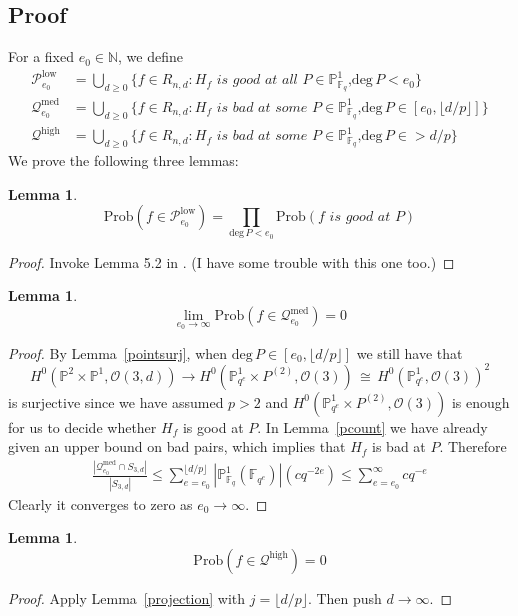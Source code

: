 \documentclass[12pt]{article}
\theoremstyle{plain}
\newtheorem{lemma}[equation]{Lemma}
\theoremstyle{definition}
\newcommand{\sP}{\mathcal{P}}
\newcommand{\IN}{\mathbb{N}}
\newcommand{\IF}{\mathbb{F}}
\newcommand{\IP}{\mathbb{P}}
\newcommand{\sO}{\mathcal{O}}
\renewcommand{\deg}{\mathrm{deg}\,}
\newcommand\iso{{\, \cong \,}}
\newcommand\union{\bigcup}
\newcommand{\<}{\langle}
\renewcommand{\>}{\rangle}
\newcommand{\fl}[1]{\lfloor #1 \rfloor}
\newcommand{\sQ}{\mathcal{Q}}
\newcommand{\Prob}{\mathrm{Prob}}
\begin{document}
\subsection{Proof}
For a fixed $e_0 \in \IN$, we define 
\begin{align*}
\sP_{e_0}^{\mathrm{low}} &= \union_{d \ge 0} \{ f \in R_{n, d} : H_f \textit{ is good at all $P \in \IP^1_{\IF_q}$,}\deg P < e_0\}\\
\sQ_{e_0}^{\mathrm{med}} &= \union_{d \ge 0} \{f \in R_{n, d} : H_f \textit{ is bad at some $P \in \IP^1_{\IF_q}$,}\deg P \in [e_0, \lfloor d/p \rfloor]\}\\
\sQ^{\mathrm{high}} &= \union_{d \ge 0} \{f \in R_{n, d} : H_f \textit{ is bad at some $P \in \IP^1_{\IF_q}$,}\deg P \in > d/p\}
\end{align*}
We prove the following three lemmas: 
\begin{lemma}
$$\Prob(f \in \sP_{e_0}^{\mathrm{low}}) = \prod_{\deg P < e_0} \Prob(f \textit{ is good at }P)$$
\end{lemma}
\begin{proof}
Invoke Lemma 5.2 in \cite{Wood}. (I have some trouble with this one too.)
\end{proof}

\begin{lemma}
$$ \lim_{e_0 \to \infty} \Prob(f \in \sQ_{e_0}^{\mathrm{med}}) = 0 $$
\end{lemma}
\begin{proof}
By Lemma~\ref{pointsurj}, when $\deg P \in [e_0, \lfloor d/p \rfloor]$ we still have that 
$$ H^0(\IP^2 \times \IP^1, \sO(3, d)) \to H^0(\IP^1_{q^e} \times P^{(2)}, \sO(3)) \iso H^0(\IP^1_{q^e}, \sO(3))^2 $$ is surjective since we have assumed $p > 2$ and $H^0(\IP^1_{q^e} \times P^{(2)}, \sO(3))$ is enough for us to decide whether $H_f$ is good at $P$. In Lemma~\ref{pcount} we have already given an upper bound on bad pairs, which implies that $H_f$ is bad at $P$. Therefore 
\begin{align*}
\frac{|\sQ_{e_0}^{\mathrm{med}} \cap S_{3, d}|}{|S_{3, d}|} \le \sum_{e = e_0}^{\fl{d/p} }|\IP^1_{\IF_{q}}(\IF_{q^e})| (c q^{-2e}) \le \sum_{e = e_0}^{\infty}c q^{-e}
\end{align*}
Clearly it converges to zero as $e_0 \to \infty$. 
\end{proof}

\begin{lemma}
$$ \Prob(f \in \sQ^{\mathrm{high}}) = 0 $$
\end{lemma}
\begin{proof}
Apply Lemma~\ref{projection} with $j = \fl{d/p}$. Then push $d \to \infty$. 
\end{proof}
\end{document}
